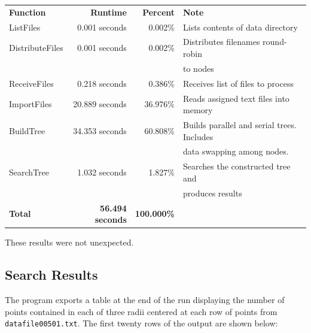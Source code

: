 \begin{tabular}{l r r l}
\textbf{Function}         & \textbf{Runtime}        & \textbf{Percent} & \textbf{Note} \\
ListFiles        &  0.001 seconds & 0.002\% & Lists contents of data directory \\
DistributeFiles  &  0.001 seconds & 0.002\% & Distributes filenames round-robin \\
& & & to nodes \\
ReceiveFiles     &  0.218 seconds & 0.386\% & Receives list of files to process \\
ImportFiles      & 20.889 seconds & 36.976\% & Reads assigned text files into memory \\
BuildTree        & 34.353 seconds & 60.808\% & Builds parallel and serial trees. Includes \\
& & & data swapping among nodes.\\
SearchTree       &  1.032 seconds & 1.827\% & Searches the constructed tree and \\
& & &  produces results \\
\textbf{Total}   & \textbf{56.494 seconds} & \textbf{100.000\%} & \\
\end{tabular}


These results were not unexpected.


%
%

\subsection{Search Results}

The program exports a table at the end of the run displaying the number of points contained in each of three radii centered at each row of points from  \texttt{datafile00501.txt}. The first twenty rows of the output are shown below:


